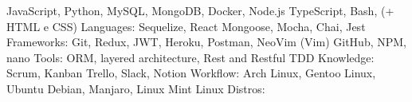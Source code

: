\begin{cvhonors}
  \cvhonor
    {JavaScript, Python, MySQL, MongoDB, Docker, Node.js}
    {TypeScript, Bash, (+ HTML e CSS)}
    {}
    {Languages:}
  \cvhonor
    {Sequelize, React}
    {Mongoose, Mocha, Chai, Jest}
    {}
    {Frameworks:}
  \cvhonor
    {Git, Redux, JWT, Heroku, Postman, NeoVim (Vim)}
    {GitHub, NPM, nano}
    {}
    {Tools:}
 \cvhonor
    {ORM, layered architecture, Rest and Restful}
    {TDD}
    {}
    {Knowledge:}
  \cvhonor
    {Scrum, Kanban}
    {Trello, Slack, Notion}
    {}
    {Workflow:}
  \cvhonor
    {Arch Linux, Gentoo Linux, Ubuntu}
    {Debian, Manjaro, Linux Mint}
    {}
    {Linux Distros:}
\end{cvhonors}

\vspace{.5cm}
